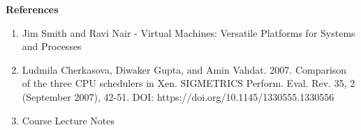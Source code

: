 \documentclass[11pt,a4paper,oneside]{article}
\begin{document}
\begin{enumerate}
	
		
		    
	\end{enumerate}
    
    \textbf{References}
    \begin{enumerate}
    	\item Jim Smith and Ravi Nair - Virtual Machines: Versatile Platforms for Systems and Processes 
    	\item Ludmila Cherkasova, Diwaker Gupta, and Amin Vahdat. 2007. Comparison of the three CPU schedulers in Xen. SIGMETRICS Perform. Eval. Rev. 35, 2 (September 2007), 42-51. DOI: https://doi.org/10.1145/1330555.1330556
    	\item Course Lecture Notes   	
    \end{enumerate}
 

    
\end{document}

